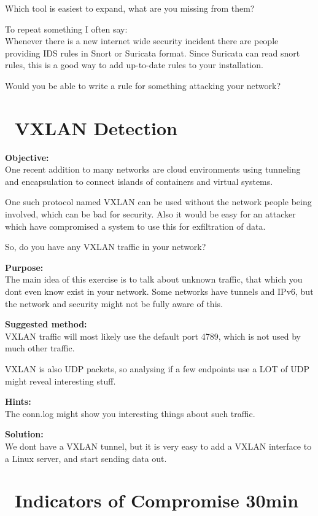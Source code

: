 \documentclass[a4paper,11pt,notitlepage]{report}
\begin{document}
Which tool is easiest to expand, what are you missing from them?

To repeat something I often say:\\
Whenever there is a new internet wide security incident there are people providing IDS rules in Snort or Suricata format. Since Suricata can read snort rules, this is a good way to add up-to-date rules to your installation.

Would you be able to write a rule for something attacking your network?


\chapter{\faInfoCircle\ VXLAN Detection}
\label{ex:vxlandetect}


{\bf Objective:} \\
One recent addition to many networks are cloud environments using tunneling and encapsulation to connect islands of containers and virtual systems.

One such protocol named VXLAN can be used without the network people being involved, which can be bad for security. Also it would be easy for an attacker which have compromised a system to use this for exfiltration of data.

So, do you have any VXLAN traffic in your network?


{\bf Purpose:}\\
The main idea of this exercise is to talk about unknown traffic, that which you dont even know exist in your network. Some networks have tunnels and IPv6, but the network and security might not be fully aware of this.


{\bf Suggested method:}\\
VXLAN traffic will most likely use the default port 4789, which is not used by much other traffic.

VXLAN is also UDP packets, so analysing if a few endpoints use a LOT of UDP might reveal interesting stuff.


{\bf Hints:}\\
The conn.log might show you interesting things about such traffic.


{\bf Solution:}\\
We dont have a VXLAN tunnel, but it is very easy to add a VXLAN interface to a Linux server, and start sending data out.





\chapter{\faExclamationTriangle\ Indicators of Compromise 30min}
\label{ex:zeekioc}
\end{document}
